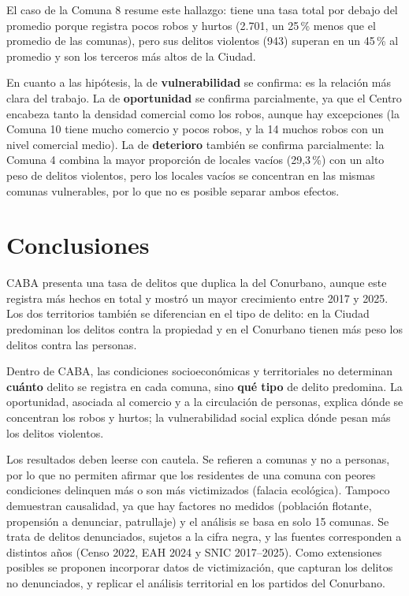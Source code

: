 \documentclass[11pt,a4paper]{article}
\begin{document}
El caso de la Comuna 8 resume este hallazgo: tiene una tasa total por debajo del promedio porque registra pocos robos y hurtos (2.701, un 25\,\% menos que el promedio de las comunas), pero sus delitos violentos (943) superan en un 45\,\% al promedio y son los terceros más altos de la Ciudad.

En cuanto a las hipótesis, la de \textbf{vulnerabilidad} se confirma: es la relación más clara del trabajo. La de \textbf{oportunidad} se confirma parcialmente, ya que el Centro encabeza tanto la densidad comercial como los robos, aunque hay excepciones (la Comuna 10 tiene mucho comercio y pocos robos, y la 14 muchos robos con un nivel comercial medio). La de \textbf{deterioro} también se confirma parcialmente: la Comuna 4 combina la mayor proporción de locales vacíos (29,3\,\%) con un alto peso de delitos violentos, pero los locales vacíos se concentran en las mismas comunas vulnerables, por lo que no es posible separar ambos efectos.

\section{Conclusiones}
CABA presenta una tasa de delitos que duplica la del Conurbano, aunque este registra más hechos en total y mostró un mayor crecimiento entre 2017 y 2025. Los dos territorios también se diferencian en el tipo de delito: en la Ciudad predominan los delitos contra la propiedad y en el Conurbano tienen más peso los delitos contra las personas.

Dentro de CABA, las condiciones socioeconómicas y territoriales no determinan \textbf{cuánto} delito se registra en cada comuna, sino \textbf{qué tipo} de delito predomina. La oportunidad, asociada al comercio y a la circulación de personas, explica dónde se concentran los robos y hurtos; la vulnerabilidad social explica dónde pesan más los delitos violentos.

Los resultados deben leerse con cautela. Se refieren a comunas y no a personas, por lo que no permiten afirmar que los residentes de una comuna con peores condiciones delinquen más o son más victimizados (falacia ecológica). Tampoco demuestran causalidad, ya que hay factores no medidos (población flotante, propensión a denunciar, patrullaje) y el análisis se basa en solo 15 comunas. Se trata de delitos denunciados, sujetos a la cifra negra, y las fuentes corresponden a distintos años (Censo 2022, EAH 2024 y SNIC 2017--2025). Como extensiones posibles se proponen incorporar datos de victimización, que capturan los delitos no denunciados, y replicar el análisis territorial en los partidos del Conurbano.
\end{document}
